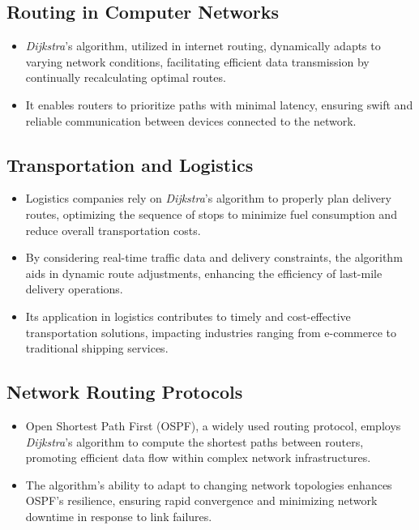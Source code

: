 \documentclass[12pt, a4paper]{article}
\begin{document}
\subsection{Routing in Computer Networks}
\begin{itemize}
  \item \textit{Dijkstra}'s algorithm, utilized in internet routing, dynamically adapts to varying network conditions, facilitating efficient data transmission by continually recalculating optimal routes.
  \item It enables routers to prioritize paths with minimal latency, ensuring swift and reliable communication between devices connected to the network.

\end{itemize}

\subsection{Transportation and Logistics}
\begin{itemize}
  \item Logistics companies rely on \textit{Dijkstra}'s algorithm to properly plan delivery routes, optimizing the sequence of stops to minimize fuel consumption and reduce overall transportation costs.
  \item By considering real-time traffic data and delivery constraints, the algorithm aids in dynamic route adjustments, enhancing the efficiency of last-mile delivery operations.
  \item Its application in logistics contributes to timely and cost-effective transportation solutions, impacting industries ranging from e-commerce to traditional shipping services.
\end{itemize}

\subsection{Network Routing Protocols}
\begin{itemize}
  \item Open Shortest Path First (OSPF), a widely used routing protocol, employs \textit{Dijkstra}'s algorithm to compute the shortest paths between routers, promoting efficient data flow within complex network infrastructures.
  \item The algorithm's ability to adapt to changing network topologies enhances OSPF's resilience, ensuring rapid convergence and minimizing network downtime in response to link failures.

\end{itemize}
\end{document}
